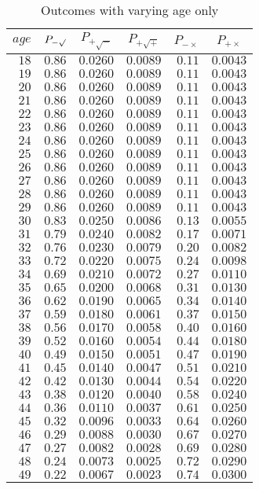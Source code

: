%
\begin{table}[\hbtp]
 \small
 \begin{center}
 \begin{tabular}{rrrrrr}\hline\hline
\multicolumn{1}{c}{$age$}&\multicolumn{1}{c}{$P_{-\surd}$}&\multicolumn{1}{c}{$P_{+\surd - }$}&\multicolumn{1}{c}{$P_{+\surd +}$}&\multicolumn{1}{c}{$P_{-\times}$}&\multicolumn{1}{c}{$P_{+\times}$}\tabularnewline
\hline
$18$&$0.86$&$0.0260$&$0.0089$&$0.11$&$0.0043$\tabularnewline
$19$&$0.86$&$0.0260$&$0.0089$&$0.11$&$0.0043$\tabularnewline
$20$&$0.86$&$0.0260$&$0.0089$&$0.11$&$0.0043$\tabularnewline
$21$&$0.86$&$0.0260$&$0.0089$&$0.11$&$0.0043$\tabularnewline
$22$&$0.86$&$0.0260$&$0.0089$&$0.11$&$0.0043$\tabularnewline
$23$&$0.86$&$0.0260$&$0.0089$&$0.11$&$0.0043$\tabularnewline
$24$&$0.86$&$0.0260$&$0.0089$&$0.11$&$0.0043$\tabularnewline
$25$&$0.86$&$0.0260$&$0.0089$&$0.11$&$0.0043$\tabularnewline
$26$&$0.86$&$0.0260$&$0.0089$&$0.11$&$0.0043$\tabularnewline
$27$&$0.86$&$0.0260$&$0.0089$&$0.11$&$0.0043$\tabularnewline
$28$&$0.86$&$0.0260$&$0.0089$&$0.11$&$0.0043$\tabularnewline
$29$&$0.86$&$0.0260$&$0.0089$&$0.11$&$0.0043$\tabularnewline
$30$&$0.83$&$0.0250$&$0.0086$&$0.13$&$0.0055$\tabularnewline
$31$&$0.79$&$0.0240$&$0.0082$&$0.17$&$0.0071$\tabularnewline
$32$&$0.76$&$0.0230$&$0.0079$&$0.20$&$0.0082$\tabularnewline
$33$&$0.72$&$0.0220$&$0.0075$&$0.24$&$0.0098$\tabularnewline
$34$&$0.69$&$0.0210$&$0.0072$&$0.27$&$0.0110$\tabularnewline
$35$&$0.65$&$0.0200$&$0.0068$&$0.31$&$0.0130$\tabularnewline
$36$&$0.62$&$0.0190$&$0.0065$&$0.34$&$0.0140$\tabularnewline
$37$&$0.59$&$0.0180$&$0.0061$&$0.37$&$0.0150$\tabularnewline
$38$&$0.56$&$0.0170$&$0.0058$&$0.40$&$0.0160$\tabularnewline
$39$&$0.52$&$0.0160$&$0.0054$&$0.44$&$0.0180$\tabularnewline
$40$&$0.49$&$0.0150$&$0.0051$&$0.47$&$0.0190$\tabularnewline
$41$&$0.45$&$0.0140$&$0.0047$&$0.51$&$0.0210$\tabularnewline
$42$&$0.42$&$0.0130$&$0.0044$&$0.54$&$0.0220$\tabularnewline
$43$&$0.38$&$0.0120$&$0.0040$&$0.58$&$0.0240$\tabularnewline
$44$&$0.36$&$0.0110$&$0.0037$&$0.61$&$0.0250$\tabularnewline
$45$&$0.32$&$0.0096$&$0.0033$&$0.64$&$0.0260$\tabularnewline
$46$&$0.29$&$0.0088$&$0.0030$&$0.67$&$0.0270$\tabularnewline
$47$&$0.27$&$0.0082$&$0.0028$&$0.69$&$0.0280$\tabularnewline
$48$&$0.24$&$0.0073$&$0.0025$&$0.72$&$0.0290$\tabularnewline
$49$&$0.22$&$0.0067$&$0.0023$&$0.74$&$0.0300$\tabularnewline
\hline
\end{tabular}

\end{center}

\caption{Outcomes with varying age only\label{tbl:age_varying_only}} 

\end{table}

